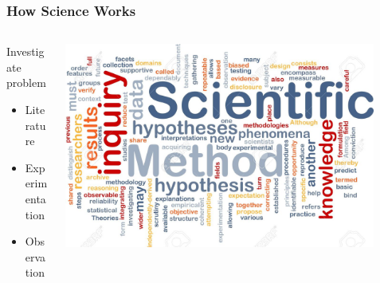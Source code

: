 \documentclass[10pt]{beamer}
\begin{document}
\begin{frame}[t]
\frametitle{How Science Works}
\vspace{0.5cm}

	\begin{columns}
		\begin{column}{0.5\textwidth}
			Investigate problem
				\begin{itemize}
					\item Literature
					\smallskip
					\item Experimentation
					\smallskip
					\item Observation
				\end{itemize}
		\end{column}
		
		\begin{column}{0.5\textwidth}
			\begin{center}
				\includegraphics[width=0.9\textwidth]{figures/science3.jpg}
			\end{center}
		\end{column}
	\end{columns}
\end{frame}
\end{document}
